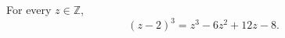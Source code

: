 \documentclass{article}
\begin{document}
\begin{theorem}\label{hold:cube}
For every $z\in\mathbb{Z}$,
\[(z-2)^3=z^3-6z^2+12z-8.\]
\end{theorem}
\end{document}
